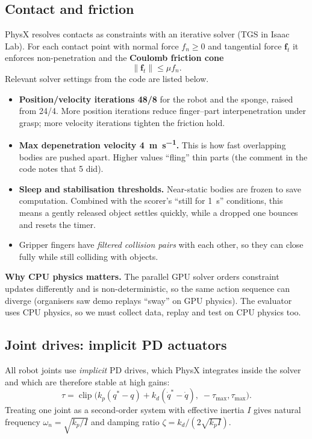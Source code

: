\documentclass[10pt,a4paper]{article}
\begin{document}
\subsection{Contact and friction}
PhysX resolves contacts as constraints with an iterative solver (TGS in Isaac Lab). For each contact point with normal force $f_n\ge 0$ and tangential force $\bm f_t$ it enforces non-penetration and the \textbf{Coulomb friction cone}
\begin{equation}
\|\bm f_t\|\le\mu f_n .
\end{equation}
Relevant solver settings from the code are listed below.
\begin{itemize}
\item \textbf{Position/velocity iterations 48/8} for the robot and the sponge, raised from 24/4. More position iterations reduce finger--part interpenetration under grasp; more velocity iterations tighten the friction hold.
\item \textbf{Max depenetration velocity \SI{4}{\metre\per\second}.} This is how fast overlapping bodies are pushed apart. Higher values ``fling'' thin parts (the comment in the code notes that 5 did).
\item \textbf{Sleep and stabilisation thresholds.} Near-static bodies are frozen to save computation. Combined with the scorer's ``still for \SI{1}{\second}'' conditions, this means a gently released object settles quickly, while a dropped one bounces and resets the timer.
\item Gripper fingers have \emph{filtered collision pairs} with each other, so they can close fully while still colliding with objects.
\end{itemize}
\begin{keypt}\footnotesize\textbf{Why CPU physics matters.} The parallel GPU solver orders constraint updates differently and is non-deterministic, so the same action sequence can diverge (organisers saw demo replays ``sway'' on GPU physics). The evaluator uses CPU physics, so we must collect data, replay and test on CPU physics too.\end{keypt}

\subsection{Joint drives: implicit PD actuators}
All robot joints use \emph{implicit} PD drives, which PhysX integrates inside the solver and which are therefore stable at high gains:
\begin{equation}
\tau=\operatorname{clip}\!\big(k_p(q^\ast-q)+k_d(\dot q^\ast-\dot q),\;-\tau_{\max},\tau_{\max}\big).
\end{equation}
Treating one joint as a second-order system with effective inertia $I$ gives natural frequency $\omega_n=\sqrt{k_p/I}$ and damping ratio $\zeta=k_d/(2\sqrt{k_pI})$.
\end{document}
